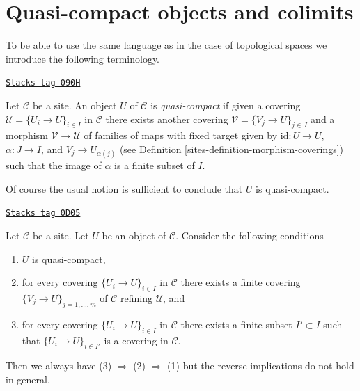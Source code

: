 \section{Quasi-compact objects and colimits}
\label{sites-section-quasi-compact}
To be able to use the same language as in the case of topological spaces
we introduce the following terminology.

\begin{definition}
\label{sites-definition-quasi-compact}
\href{https://stacks.math.columbia.edu/tag/090H}{\texttt{Stacks tag 090H}}

Let $\mathcal{C}$ be a site. An object $U$ of $\mathcal{C}$ is
{\it quasi-compact} if given a covering $\mathcal{U} = \{U_i \to U\}_{i \in I}$
in $\mathcal{C}$ there exists another covering
$\mathcal{V} = \{V_j \to U\}_{j \in J}$ and a morphism
$\mathcal{V} \to \mathcal{U}$ of families of maps with fixed target
given by $\text{id} : U \to U$, $\alpha : J \to I$, and $V_j \to U_{\alpha(j)}$
(see Definition \ref{sites-definition-morphism-coverings})
such that the image of $\alpha$ is a finite subset of $I$.
\end{definition}

Of course the usual notion is sufficient to conclude that
$U$ is quasi-compact.

\begin{lemma}
\label{sites-lemma-conclude-quasi-compact}
\href{https://stacks.math.columbia.edu/tag/0D05}{\texttt{Stacks tag 0D05}}

Let $\mathcal{C}$ be a site. Let $U$ be an object of $\mathcal{C}$.
Consider the following conditions
\begin{enumerate}
\item $U$ is quasi-compact,
\item for every covering $\{U_i \to U\}_{i \in I}$ in $\mathcal{C}$
there exists a finite covering $\{V_j \to U\}_{j = 1, \ldots, m}$
of $\mathcal{C}$ refining $\mathcal{U}$, and
\item for every covering $\{U_i \to U\}_{i \in I}$ in $\mathcal{C}$
there exists a finite subset $I' \subset I$ such that
$\{U_i \to U\}_{i \in I'}$ is a covering in $\mathcal{C}$.
\end{enumerate}
Then we always have (3) $\Rightarrow$ (2) $\Rightarrow$ (1)
but the reverse implications do not hold in general.
\end{lemma}

